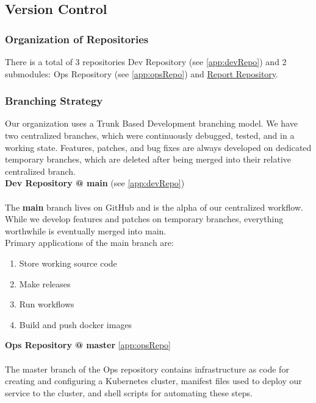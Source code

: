 \subsection{Version Control}
\label{subsec:vs}
\subsubsection{Organization of Repositories}
There is a total of 3 repositories Dev Repository (see \ref{app:devRepo}) and 2 submodules: Ops Repository (see \ref{app:opsRepo}) and \href{https://github.com/Akongstad/DevOps-Report}{Report Repository}.
\subsubsection{Branching Strategy}


Our organization uses a Trunk Based Development branching model. We have two centralized branches, which were continuously debugged, tested, and in a working state. Features, patches, and bug fixes are always developed on dedicated temporary branches, which are deleted after being merged into their relative centralized branch.\\

\textbf{Dev Repository @ main} (see \ref{app:devRepo})\\\\
The \textbf{main} branch lives on GitHub and is the alpha of our centralized workflow. While we develop features and patches on temporary branches, everything worthwhile is eventually merged into main. \\

Primary applications of the main branch are:
\begin{enumerate}
    \item Store working source code
    \item Make releases
    \item Run workflows
    \item Build and push docker images\\
\end{enumerate}

\textbf{Ops Repository @ master} \ref{app:opsRepo}\\\\
The master branch of the Ops repository contains infrastructure as code for creating and configuring a Kubernetes cluster, manifest files used to deploy our service to the cluster, and shell scripts for automating these steps.


